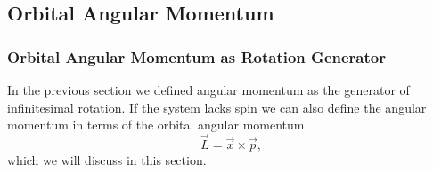 \subsection{Orbital Angular Momentum}

\subsubsection{Orbital Angular Momentum as Rotation Generator}
In the previous section we defined angular momentum as the generator of infinitesimal rotation. If the system lacks spin we can also define the angular momentum in terms of the orbital angular momentum 
\begin{equation}
    \vec{L} = \vec{x} \times \vec{p},
\end{equation}
which we will discuss in this section.

